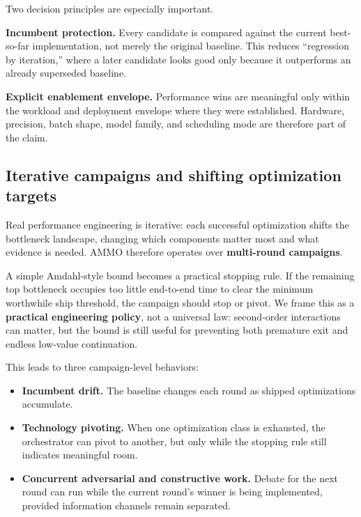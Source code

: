 \documentclass[11pt]{article}
\begin{document}
Two decision principles are especially important.

\textbf{Incumbent protection.} Every candidate is compared against the current best-so-far implementation, not merely the original baseline. This reduces ``regression by iteration,'' where a later candidate looks good only because it outperforms an already superseded baseline.

\textbf{Explicit enablement envelope.} Performance wins are meaningful only within the workload and deployment envelope where they were established. Hardware, precision, batch shape, model family, and scheduling mode are therefore part of the claim.

\subsection{Iterative campaigns and shifting optimization targets}

Real performance engineering is iterative: each successful optimization shifts the bottleneck landscape, changing which components matter most and what evidence is needed. AMMO therefore operates over \textbf{multi-round campaigns}.

A simple Amdahl-style bound becomes a practical stopping rule. If the remaining top bottleneck occupies too little end-to-end time to clear the minimum worthwhile ship threshold, the campaign should stop or pivot. We frame this as a \textbf{practical engineering policy}, not a universal law: second-order interactions can matter, but the bound is still useful for preventing both premature exit and endless low-value continuation.

This leads to three campaign-level behaviors:

\begin{itemize}[leftmargin=*,itemsep=2pt]
  \item \textbf{Incumbent drift.} The baseline changes each round as shipped optimizations accumulate.
  \item \textbf{Technology pivoting.} When one optimization class is exhausted, the orchestrator can pivot to another, but only while the stopping rule still indicates meaningful room.
  \item \textbf{Concurrent adversarial and constructive work.} Debate for the next round can run while the current round's winner is being implemented, provided information channels remain separated.
\end{itemize}

\end{document}
